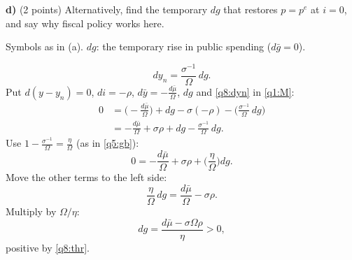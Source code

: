 \textbf{d)} (2 points) Alternatively, find the temporary $dg$ that restores $p=p^e$ at $i=0$, and say why fiscal policy works here.
\resolespaco
\begin{sol}
\begin{notacao}
\item Symbols as in (a). $dg$: the temporary rise in public spending ($d\bar g=0$).
\end{notacao}
\begin{equation}
dy_n=\frac{\sigma^{-1}}{\Omega}\,dg . \label{q8:dyn}
\end{equation}
Put $d(y-y_n)=0$, $di=-\rho$, $d\bar y=-\frac{d\bar\mu}{\Omega}$, $dg$ and \eqref{q8:dyn} in \eqref{q1:M}:
\begin{align}
0&=\Big(-\frac{d\bar\mu}{\Omega}\Big)+dg-\sigma(-\rho)-\Big(\frac{\sigma^{-1}}{\Omega}\,dg\Big)\nonumber\\
&=-\frac{d\bar\mu}{\Omega}+\sigma\rho+dg-\frac{\sigma^{-1}}{\Omega}\,dg . \nonumber
\end{align}
Use $1-\frac{\sigma^{-1}}{\Omega}=\frac{\eta}{\Omega}$ (as in \eqref{q5:gb}):
\begin{equation}
0=-\frac{d\bar\mu}{\Omega}+\sigma\rho+\Big(\frac{\eta}{\Omega}\Big)dg . \nonumber
\end{equation}
Move the other terms to the left side:
\begin{equation}
\frac{\eta}{\Omega}\,dg=\frac{d\bar\mu}{\Omega}-\sigma\rho . \nonumber
\end{equation}
Multiply by $\Omega/\eta$:
\begin{equation}
dg=\frac{d\bar\mu-\sigma\Omega\rho}{\eta}>0 , \label{q8:g}
\end{equation}
positive by \eqref{q8:thr}.
\end{sol}
